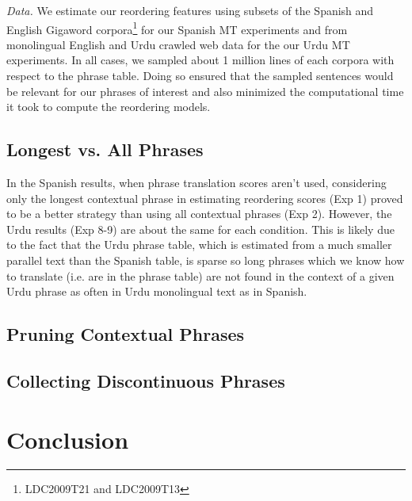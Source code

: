 \documentclass[11pt,letterpaper]{article}
\newcommand{\todo}[1]{\textcolor{red}{TODO: #1}}
\newcommand{\paraheader}[1]{\vskip 0.05in \noindent\emph{#1}}
\begin{document}
\paraheader{Data.} We estimate our reordering features using subsets of the Spanish and English Gigaword corpora\footnote{LDC2009T21 and LDC2009T13} for our Spanish MT experiments and from monolingual English and Urdu crawled web data for the our Urdu MT experiments. In all cases, we sampled about 1 million lines of each corpora with respect to the phrase table. Doing so ensured that the sampled sentences would be relevant for our phrases of interest and also minimized the computational time it took to compute the reordering models.


\subsection{Longest vs. All Phrases}
In the Spanish results, when phrase translation scores aren't used, considering only the longest contextual phrase in estimating reordering scores (Exp 1) proved to be a better strategy than using all contextual phrases (Exp 2). However, the Urdu results (Exp 8-9) are about the same for each condition. This is likely due to the fact that the Urdu phrase table, which is estimated from a much smaller parallel text than the Spanish table, is sparse so long phrases which we know how to translate (i.e. are in the phrase table) are not found in the context of a given Urdu phrase as often in Urdu monolingual text as in Spanish. 

\subsection{Pruning Contextual Phrases}

\subsection{Collecting Discontinuous Phrases}

\section{Conclusion}






\end{document}
